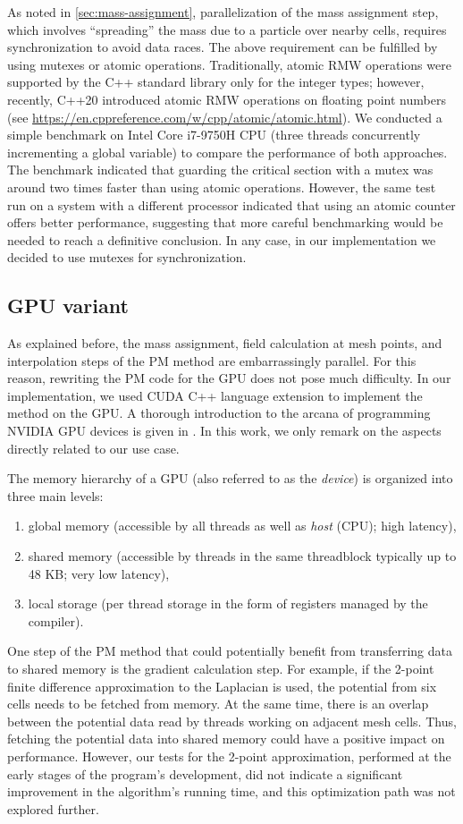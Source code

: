 As noted in \autoref{sec:mass-assignment}, parallelization of the mass assignment step, which involves ``spreading'' the mass due to a particle over nearby cells, requires synchronization to avoid data races.
The above requirement can be fulfilled by using mutexes or atomic operations.
Traditionally, atomic RMW operations were supported by the C++ standard library only for the integer types; however, recently, C++20 introduced atomic RMW operations on floating point numbers (see \url{https://en.cppreference.com/w/cpp/atomic/atomic.html}).
We conducted a simple benchmark on Intel Core i7-9750H CPU (three threads concurrently incrementing a global variable) to compare the performance of both approaches.
The benchmark indicated that guarding the critical section with a mutex was around two times faster than using atomic operations.
However, the same test run on a system with a different processor indicated that using an atomic counter offers better performance, suggesting that more careful benchmarking would be needed to reach a definitive conclusion.
In any case, in our implementation we decided to use mutexes for synchronization.

\subsection{GPU variant}\label{subsec:gpu-variant}
As explained before, the mass assignment, field calculation at mesh points, and interpolation steps of the PM method are embarrassingly parallel.
For this reason, rewriting the PM code for the GPU does not pose much difficulty.
In our implementation, we used CUDA C++ language extension to implement the method on the GPU.
A thorough introduction to the arcana of programming NVIDIA GPU devices is given in \cite{nvidia2025cuda}.
In this work, we only remark on the aspects directly related to our use case.

The memory hierarchy of a GPU (also referred to as the \textit{device}) is organized into three main levels:
\begin{enumerate}
    \item global memory (accessible by all threads as well as \textit{host} (CPU); high latency),
    \item shared memory (accessible by threads in the same threadblock typically up to 48 KB; very low latency),
    \item local storage (per thread storage in the form of registers managed by the compiler).
\end{enumerate}
One step of the PM method that could potentially benefit from transferring data to shared memory is the gradient calculation step.
For example, if the 2-point finite difference approximation to the Laplacian is used, the potential from six cells needs to be fetched from memory.
At the same time, there is an overlap between the potential data read by threads working on adjacent mesh cells.
Thus, fetching the potential data into shared memory could have a positive impact on performance.
However, our tests for the 2-point approximation, performed at the early stages of the program's development, did not indicate a significant improvement in the algorithm's running time, and this optimization path was not explored further.

